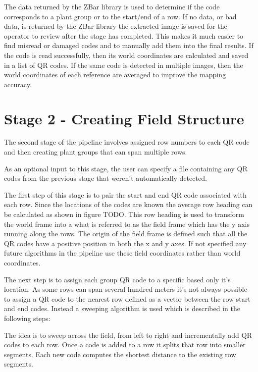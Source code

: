 The data returned by the ZBar library is used to determine if the code corresponds to a plant group or to the start/end of a row.  If no data, or bad data, is returned by the ZBar library the extracted image is saved for the operator to review after the stage has completed.  This makes it much easier to find misread or damaged codes and to manually add them into the final results.  If the code is read successfully, then its world coordinates are calculated and saved in a list of QR codes.   If the same code is detected in multiple images, then the world coordinates of each reference are averaged to improve the mapping accuracy.

\section{Stage 2 - Creating Field Structure}
\label{processing-stage2}

The second stage of the pipeline involves assigned row numbers to each QR code and then creating plant groups that can span multiple rows.  

As an optional input to this stage, the user can specify a file containing any QR codes from the previous stage that weren't automatically detected.  

The first step of this stage is to pair the start and end QR code associated with each row.  Since the locations of the codes are known the average row heading can be calculated as shown in figure TODO.  This row heading is used to transform the world frame into a what is referred to as the field frame which has the y axis running along the rows.  The origin of the field frame is defined such that all the QR codes have a positive position in both the x and y axes.  If not specified any future algorithms in the pipeline use these field coordinates rather than world coordinates.  

The next step is to assign each group QR code to a specific based only it's location.  As some rows can span several hundred meters it's not always possible to assign a QR code to the nearest row defined as a vector between the row start and end codes.  Instead a sweeping algorithm is used which is described in the following steps:

The idea is to sweep across the field, from left to right and incrementally add QR codes to each row. Once a code is added to a row it splits that row into smaller segments.  Each new code computes the shortest distance to the existing row segments.

